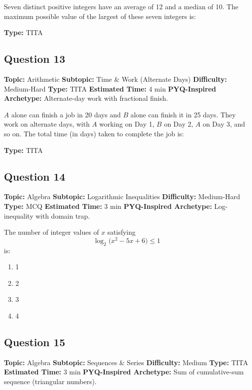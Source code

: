 \documentclass[11pt]{article}
\begin{document}
\begin{tcolorbox}
Seven distinct positive integers have an average of 12 and a median of 10. The maximum possible value of the largest of these seven integers is:
\end{tcolorbox}

\textbf{Type:} TITA

\subsection*{Question 13}
\textbf{Topic:} Arithmetic \quad
\textbf{Subtopic:} Time \& Work (Alternate Days) \quad
\textbf{Difficulty:} Medium-Hard \quad
\textbf{Type:} TITA \quad
\textbf{Estimated Time:} 4 min \quad
\textbf{PYQ-Inspired Archetype:} Alternate-day work with fractional finish.

\begin{tcolorbox}
\(A\) alone can finish a job in 20 days and \(B\) alone can finish it in 25 days. They work on alternate days, with \(A\) working on Day 1, \(B\) on Day 2, \(A\) on Day 3, and so on. The total time (in days) taken to complete the job is:
\end{tcolorbox}

\textbf{Type:} TITA

\subsection*{Question 14}
\textbf{Topic:} Algebra \quad
\textbf{Subtopic:} Logarithmic Inequalities \quad
\textbf{Difficulty:} Medium-Hard \quad
\textbf{Type:} MCQ \quad
\textbf{Estimated Time:} 3 min \quad
\textbf{PYQ-Inspired Archetype:} Log-inequality with domain trap.

\begin{tcolorbox}
The number of integer values of \(x\) satisfying
\[
\log_{2}\!\big(x^{2} - 5x + 6\big) \le 1
\]
is:
\end{tcolorbox}

\begin{enumerate}[label=(\Alph*)]
\item 1
\item 2
\item 3
\item 4
\end{enumerate}

\subsection*{Question 15}
\textbf{Topic:} Algebra \quad
\textbf{Subtopic:} Sequences \& Series \quad
\textbf{Difficulty:} Medium \quad
\textbf{Type:} TITA \quad
\textbf{Estimated Time:} 3 min \quad
\textbf{PYQ-Inspired Archetype:} Sum of cumulative-sum sequence (triangular numbers).
\end{document}

